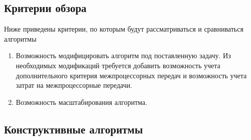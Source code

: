 \subsection{Критерии обзора}
Ниже приведены критерии, по которым будут рассматриваться и сравниваться алгоритмы
\begin{enumerate}
    \item Возможность модифицировать алгоритм под поставленную задачу. Из необходимых модификаций требуется добавить возможность учета дополнительного критерия межпроцессорных передач и возможность учета затрат на межпроцессорные передачи.
    \item Возможность масштабирования алгоритма. 
\end{enumerate}
\subsection{Конструктивные алгоритмы}
